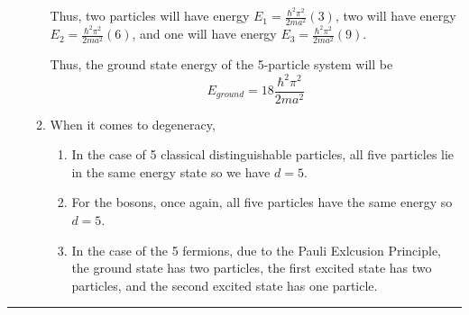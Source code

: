 \documentclass[twoside]{article}
\begin{document}
\begin{enumerate}[label=\alph*]
\begin{enumerate}
      Thus, two particles will have energy $E_1 = \frac{\hbar^2 \pi^2}{2ma^2} (3)$, two will have energy $E_2 = \frac{\hbar^2 \pi^2}{2ma^2} (6)$, and one will have energy $E_3 = \frac{\hbar^2 \pi^2}{2ma^2} (9)$.

      Thus, the ground state energy of the 5-particle system will be 
      \[ \boxed{E_{ground} = 18 \frac{\hbar^2 \pi^2}{2ma^2}} \]

      \item When it comes to degeneracy, 
      \begin{enumerate}
         \item In the case of 5 classical distinguishable particles, all five particles lie in the same energy state so we have $d = 5$.
         
         \item For the bosons, once again, all five particles have the same energy so $d = 5$.
         
         \item In the case of the 5 fermions, due to the Pauli Exlcusion Principle, the ground state has two particles, the first excited state has two particles, and the second excited state has one particle.
      \end{enumerate}
   \end{enumerate}
\end{enumerate}

\vskip 0.5cm
\hrule
\vskip 0.5cm










\end{document}
